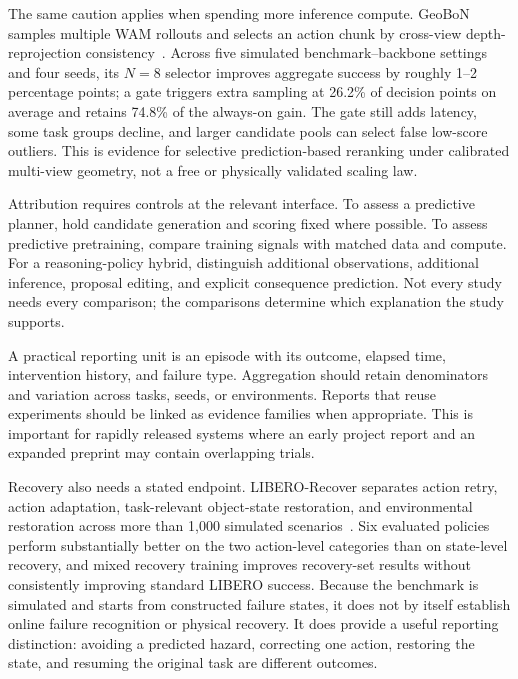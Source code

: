 The same caution applies when spending more inference compute. GeoBoN samples multiple WAM rollouts and selects an action chunk by cross-view depth-reprojection consistency~\cite{zhao2026geometricverification}. Across five simulated benchmark--backbone settings and four seeds, its $N=8$ selector improves aggregate success by roughly 1--2 percentage points; a gate triggers extra sampling at 26.2\% of decision points on average and retains 74.8\% of the always-on gain. The gate still adds latency, some task groups decline, and larger candidate pools can select false low-score outliers. This is evidence for selective prediction-based reranking under calibrated multi-view geometry, not a free or physically validated scaling law.

Attribution requires controls at the relevant interface. To assess a predictive planner, hold candidate generation and scoring fixed where possible. To assess predictive pretraining, compare training signals with matched data and compute. For a reasoning-policy hybrid, distinguish additional observations, additional inference, proposal editing, and explicit consequence prediction. Not every study needs every comparison; the comparisons determine which explanation the study supports.

A practical reporting unit is an episode with its outcome, elapsed time, intervention history, and failure type. Aggregation should retain denominators and variation across tasks, seeds, or environments. Reports that reuse experiments should be linked as evidence families when appropriate. This is important for rapidly released systems where an early project report and an expanded preprint may contain overlapping trials.

Recovery also needs a stated endpoint. LIBERO-Recover separates action retry, action adaptation, task-relevant object-state restoration, and environmental restoration across more than 1,000 simulated scenarios~\cite{liu2026liberorecover}. Six evaluated policies perform substantially better on the two action-level categories than on state-level recovery, and mixed recovery training improves recovery-set results without consistently improving standard LIBERO success. Because the benchmark is simulated and starts from constructed failure states, it does not by itself establish online failure recognition or physical recovery. It does provide a useful reporting distinction: avoiding a predicted hazard, correcting one action, restoring the state, and resuming the original task are different outcomes.

